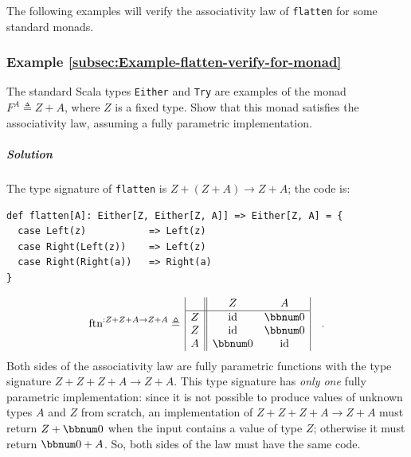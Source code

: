 The following examples will verify the associativity law of \lstinline!flatten!
for some standard monads.

\subsubsection{Example \label{subsec:Example-flatten-verify-for-monad}\ref{subsec:Example-flatten-verify-for-monad}}

The standard Scala types \lstinline!Either! and \lstinline!Try!
are examples of the monad $F^{A}\triangleq Z+A$, where $Z$ is a
fixed type. Show that this monad satisfies the associativity law,
assuming a fully parametric implementation.

\subparagraph{Solution}

The type signature of \lstinline!flatten! is $Z+\left(Z+A\right)\rightarrow Z+A$;
the code is:
\begin{lstlisting}
def flatten[A]: Either[Z, Either[Z, A]] => Either[Z, A] = {
  case Left(z)           => Left(z)
  case Right(Left(z))    => Left(z)
  case Right(Right(a))   => Right(a)
}
\end{lstlisting}
\[
\text{ftn}^{:Z+Z+A\rightarrow Z+A}\triangleq\,\begin{array}{|c||cc|}
 & Z & A\\
\hline Z & \text{id} & \bbnum 0\\
Z & \text{id} & \bbnum 0\\
A & \bbnum 0 & \text{id}
\end{array}\quad.
\]
Both sides of the associativity law are fully parametric functions
with the type signature $Z+Z+Z+A\rightarrow Z+A$. This type signature
has \emph{only one} fully parametric implementation: since it is not
possible to produce values of unknown types $A$ and $Z$ from scratch,
an implementation of $Z+Z+Z+A\rightarrow Z+A$ must return $Z+\bbnum 0$
when the input contains a value of type $Z$; otherwise it must return
$\bbnum 0+A$. So, both sides of the law must have the same code. 

